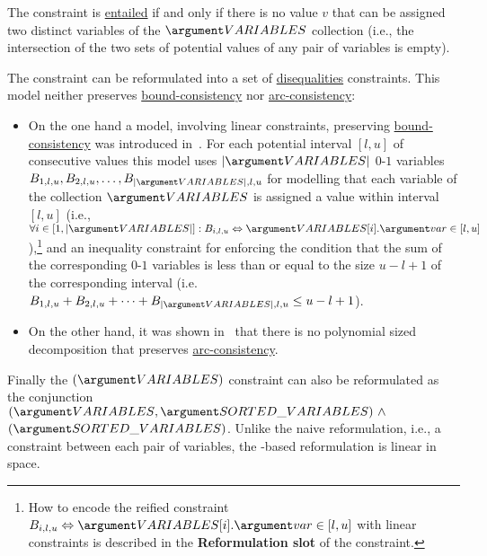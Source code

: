 \begin{ctrdesc}
The  constraint is \hyperlink{entailment}{entailed} if and only if there is no value $v$
that can be assigned two distinct variables of the $\MVARIABLES$ collection (i.e., the intersection of
the two sets of potential values of any pair of variables is empty).

\item[\pdfmarkup{subject={Reformulation},color=white,markup=Highlight}{Reformulation}{Reformulation of the constraint in terms of a conjunction of other constraints.}]
The  constraint can be reformulated into a set of \hyperlink{Cneq}{disequalities} constraints.
This model neither preserves \hyperlink{bound-consistency}{bound-consistency} nor \hyperlink{arc-consistency}{arc-consistency}:
\begin{itemize}
\item
On the one hand a model, involving linear constraints, preserving \hyperlink{bound-consistency}{bound-consistency} was introduced
in~\cite{BessiereKatsirelosNarodytskaQuimperWalsh09IJCAI}. For each potential interval $[l,u]$ of consecutive values
this model uses $|\MVARIABLES|$ $0$-$1$ variables $B_{1,l,u},B_{2,l,u},\dots,B_{|\MVARIABLES|,l,u}$ for modelling
that each variable of the collection $\MVARIABLES$ is assigned a value within interval $[l,u]$
(i.e., $\forall i\in[1,|\MVARIABLES|]: B_{i,l,u}\Leftrightarrow \MVARIABLES[i].\Mvar\in[l,u]$),\footnote{How to encode the reified constraint
$B_{i,l,u}\Leftrightarrow \MVARIABLES[i].\Mvar\in[l,u]$ with linear constraints is described in the {\bf Reformulation slot} of the
\hyperlink{Cin_interval_reified}{} constraint.}
and an inequality constraint for enforcing the condition that the sum of the corresponding $0$-$1$ variables
is less than or equal to the size $u-l+1$ of the corresponding interval (i.e.~$B_{1,l,u}+B_{2,l,u}+\dots+B_{|\MVARIABLES|,l,u}\leq u-l+1$).
\item
On the other hand, it was shown in~\cite{BessiereKatsirelosNarodytskaWalsh09} that there is no polynomial sized decomposition
that preserves \hyperlink{arc-consistency}{arc-consistency}.
\end{itemize}
Finally the  \hyperlink{Calldifferent}{}$(\MVARIABLES)$
constraint can also be reformulated as the conjunction
\hyperlink{Csort}{}$(\MVARIABLES,\MSORTEDVARIABLES)~\land~$
\hyperlink{Cstrictly_increasing}{}$(\MSORTEDVARIABLES)$.
Unlike the naive reformulation, i.e., a \hyperlink{Cneq}{} constraint between each pair of variables,
the \hyperlink{Csort}{}\nobreakdash-based reformulation is linear in space.
\ifweb\else
\newpage
\fi


\end{ctrdesc}
